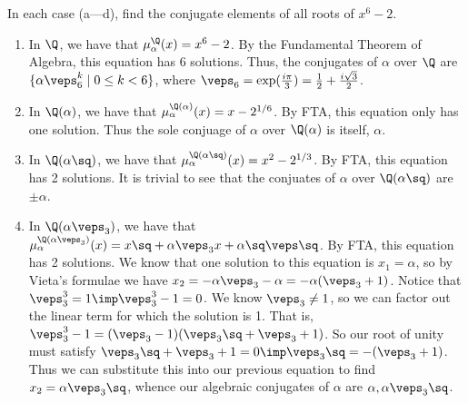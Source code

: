 \documentclass{article}
\begin{document}
\begin{subexercise}
In each case (a---d), find the conjugate elements of all roots of \( x^6-2 \).
\end{subexercise}

\begin{solution}
\begin{enumerate}[label=\alph*)]
  \item In \( \Q \), we have that \( \mu_\alpha^{\Q}(x) = x^6-2 \).
  By the Fundamental Theorem of Algebra, this equation has 6 solutions.
  Thus, the conjugates of \( \alpha \) over \( \Q \) are \( \{\alpha\veps_6^k \mid 0\leq k < 6 \} \), where \( \veps_6 = \exp(\frac{i\pi}{3}) = \frac{1}{2}+\frac{i\sqrt 3}{2} \).

  \item In \( \Q(\alpha) \), we have that \( \mu_\alpha^{\Q(\alpha)}(x) =  x - 2^{1/6} \).
  By FTA, this equation only has one solution.
  Thus the sole conjuage of \( \alpha \) over \( \Q(\alpha) \) is itself, \( \alpha \).

  \item In \( \Q(\alpha\sq) \), we have that \( \mu_\alpha^{\Q(\alpha\sq)}(x) = x^2-2^{1/3} \).
  By FTA, this equation has 2 solutions.
  It is trivial to see that the conjuates of \( \alpha \) over \( \Q(\alpha\sq) \) are \( \pm\alpha \).

  \item In \( \Q(\alpha\veps_3) \), we have that \( \mu_\alpha^{\Q(\alpha\veps_3)}(x) = x\sq+\alpha\veps_3x + \alpha\sq\veps\sq \).
  By FTA, this equation has 2 solutions.
  We know that one solution to this equation is \( x_1 = \alpha \), so by Vieta's formulae we have \( x_2 = -\alpha\veps_3 - \alpha = -\alpha(\veps_3+1) \).
  Notice that \( \veps_3^3 = 1 \imp \veps_3^3-1=0 \).
  We know \( \veps_3\neq 1 \), so we can factor out the linear term for which the solution is 1.
  That is, \( \veps_3^3-1 = (\veps_3-1)(\veps_3\sq+\veps_3+1) \).
  So our root of unity must satisfy \( \veps_3\sq+\veps_3+1 = 0 \imp \veps_3\sq=-(\veps_3+1) \).
  Thus we can substitute this into our previous equation to find \( x_2 = \alpha\veps_3\sq \), whence our algebraic conjugates of \( \alpha \) are \( \alpha, \alpha\veps_3\sq \).
\end{enumerate}
\end{solution}
\end{document}
